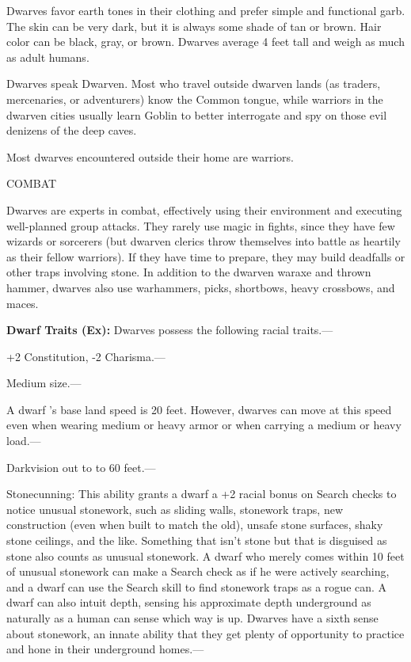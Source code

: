\documentclass{article}
\begin{document}
{Dwarves favor earth tones in their clothing and prefer simple and functional garb. 
The skin can be very dark, but it is always some shade of tan or brown. Hair color 
can be black, gray, or brown. Dwarves average 4 feet tall and weigh as much as 
adult humans.

Dwarves speak Dwarven. Most who travel outside dwarven lands (as traders, mercenaries, 
or adventurers) know the Common tongue, while warriors in the dwarven cities usually 
learn Goblin to better interrogate and spy on those evil denizens of the deep caves.

Most dwarves encountered outside their home are warriors.

COMBAT

Dwarves are experts in combat, effectively using their environment and executing 
well-planned group attacks. They rarely use magic in fights, since they have few 
wizards or sorcerers (but dwarven clerics throw themselves into battle as heartily 
as their fellow warriors). If they have time to prepare, they may build deadfalls 
or other traps involving stone. In addition to the dwarven waraxe and thrown hammer, 
dwarves also use warhammers, picks, shortbows, heavy crossbows, and maces.

\textbf{Dwarf Traits (Ex):} Dwarves possess the following racial traits.--- 

\parindent=3pt
+2 Constitution, -2 Charisma.---

\parindent=0pt
Medium size.---

A dwarf 's base land speed is 20 feet. However, dwarves can move at this speed 
even when wearing medium or heavy armor or when carrying a medium or heavy load.---

Darkvision out to to 60 feet.---

Stonecunning: This ability grants a dwarf a +2 racial bonus on Search checks to 
notice unusual stonework, such as sliding walls, stonework traps, new construction 
(even when built to match the old), unsafe stone surfaces, shaky stone ceilings, 
and the like. Something that isn't stone but that is disguised as stone also counts 
as unusual stonework. A dwarf who merely comes within 10 feet of unusual stonework 
can make a Search check as if he were actively searching, and a dwarf can use the 
Search skill to find stonework traps as a rogue can. A dwarf can also intuit depth, 
sensing his approximate depth underground as naturally as a human can sense which 
way is up. Dwarves have a sixth sense about stonework, an innate ability that they 
get plenty of opportunity to practice and hone in their underground homes.---

}
\end{document}
